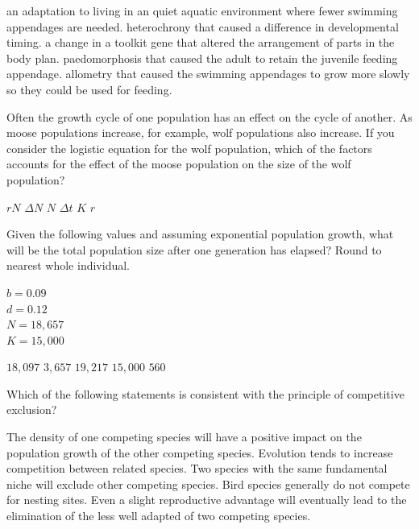 \begin{choices}
\choice an adaptation to living in an quiet aquatic environment where fewer swimming appendages are needed. 
\choice heterochrony that caused a difference in developmental timing. 
\correctchoice a change in a toolkit gene that altered the arrangement of parts in the body plan. 
\choice paedomorphosis that caused the adult to retain the juvenile feeding appendage. 
\choice allometry that caused the swimming appendages to grow more slowly so they could be used for feeding. 
\end{choices}

\question
Often the growth cycle of one population has an effect on the cycle of another. As moose populations increase, for example, wolf populations also increase. If you consider the logistic equation for the wolf population, which of the factors accounts for the effect of the moose population on the size of the wolf population?

\begin{choices}
\choice $rN$
\choice $\Delta N$
\choice $N$
\choice $\Delta t$
\correctchoice $K$
\choice $r$
\end{choices}

\question
Given the following values and assuming exponential population growth, what will be the total population size after one generation has elapsed? Round to nearest whole individual.\vspace{1ex}

\begin{minipage}{1em}
\end{minipage}%
\hspace{2em}%
\begin{minipage}{1.5in}
$b = 0.09$ \\
$d = 0.12$ \\
$N = 18,657$\\
$K = 15,000$\\
\end{minipage}

\begin{choices}
\correctchoice $18,097$
\choice $3,657$
\choice $19,217$
\choice $15,000$
\choice $560$
\end{choices}

\newpage

\question
Which of the following statements is consistent with the principle of competitive exclusion?  

\begin{choices}
\choice The density of one competing species will have a positive impact on the population growth of the other competing species. 
\choice Evolution tends to increase competition between related species.   
\choice Two species with the same fundamental niche will exclude other competing species.   
\choice Bird species generally do not compete for nesting sites.  
\correctchoice Even a slight reproductive advantage will eventually lead to the elimination of the less well adapted of two competing species. 
\end{choices}

